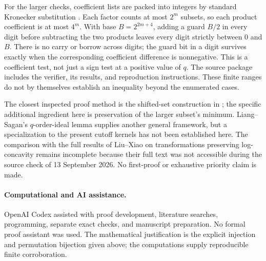 \documentclass[11pt,a4paper]{article}
\theoremstyle{remark}
\begin{document}
For the larger checks, coefficient lists are packed into integers by
standard Kronecker substitution \cite[Section 3.1]{Harvey}.
Each factor counts at most $2^m$ subsets, so each product coefficient
is at most $4^m$. With base $B=2^{2m+4}$, adding a guard $B/2$ in
every digit before subtracting the two products leaves every digit
strictly between $0$ and $B$. There is no carry or borrow across digits;
the guard bit in a digit survives exactly when the corresponding
coefficient difference is nonnegative. This is a coefficient test,
not just a sign test at a positive value of $q$.
The source package includes the verifier, its results, and reproduction
instructions. These finite ranges do not by themselves establish an
inequality beyond the enumerated cases.

The closest inspected proof method is the shifted-set construction
in \cite{Krattenthaler}; the specific additional ingredient here is
preservation of the larger subset's minimum. Liang--Sagan's
$q$-order-ideal lemma \cite[Lemma 8.10]{LiangSagan} supplies another
general framework, but a specialization to the present cutoff kernels
has not been established here. The comparison with the full results of
Liu--Xiao on transformations preserving log-concavity \cite{LiuXiao}
remains incomplete because their full text was not accessible during
the source check of 13 September 2026. No first-proof or exhaustive
priority claim is made.

\paragraph{Computational and AI assistance.}
OpenAI Codex assisted with proof development, literature searches,
programming, separate exact checks, and manuscript preparation.
No formal proof assistant was used. The mathematical justification is
the explicit injection and permutation bijection given above; the
computations supply reproducible finite corroboration.



\end{document}
